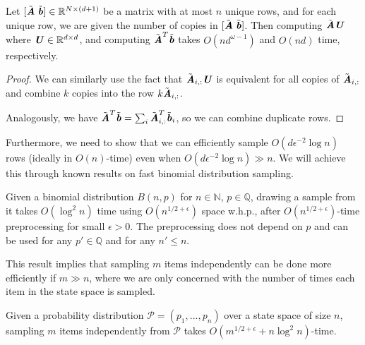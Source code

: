 \begin{corollary}\label{cor:duplicateRowsRotAndInit}
	Let $[\tilde{\AA}\; \tilde{\bb}] \in \R^{N \times (d+1)}$ be a matrix with at most $n$ unique rows, and for each unique row, we are given the number of copies in $[\tilde{\AA}\; \tilde{\bb}]$. Then computing $\tilde{\AA}\UU$ where $\UU \in \R^{d\times d}$, and computing $\tilde{\AA}^T\tilde{\bb}$ takes $O(nd^{\omega - 1})$ and $O(nd)$ time, respectively.
\end{corollary}


\begin{proof}
	We can similarly use the fact that $\tilde{\AA}_{i,:}\UU$ is equivalent for all copies of $\tilde{\AA}_{i,:}$ and combine $k$ copies into the row $k\tilde{\AA}_{i,:}$.
	
	Analogously, we have $\tilde{\AA}^T\tilde{\bb} = \sum_i\tilde{\AA}_{i,:}^T\tilde{\bb}_i$, so we can combine duplicate rows.
\end{proof}

Furthermore, we need to show that we can efficiently sample $O(d\epsilon^{-2}\log{n})$ rows (ideally in $O(n)$-time) even when $O(d\epsilon^{-2}\log{n}) \gg n$. We will achieve this through known results on fast binomial distribution sampling.

\begin{theorem}\label{thm:binSampling}
	Given a binomial distribution $B(n,p)$ for $n \in \mathbb{N}$, $p \in \mathbb{Q}$, drawing a sample from it takes $O(\log^2{n})$ time using $O(n^{1/2 + \epsilon})$ space w.h.p., after $O(n^{1/2+\epsilon})$-time preprocessing for small $\epsilon > 0$. The preprocessing does not depend on $p$ and can be used for any $p'\in \mathbb{Q}$ and for any $n' \leq n$.
	
\end{theorem}

This result implies that sampling $m$ items independently can be done more efficiently if $m \gg n$, where we are only concerned with the number of times each item in the state space is sampled.
\begin{corollary}\label{cor:binSampling}
	Given a probability distribution $\mathcal{P} = (p_1,...,p_n)$ over a state space of size $n$, sampling $m$ items independently from $\mathcal{P}$ takes $O(m^{1/2 + \epsilon} + n\log^2{n})$-time.
	
\end{corollary}

